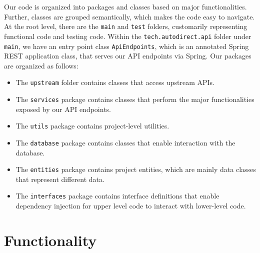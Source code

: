 \documentclass[fontsize=14pt]{article}
\begin{document}
Our code is organized into packages and classes based on major functionalities. Further, classes are grouped semantically, which makes the code easy to navigate. At the root level, there are the \texttt{main} and \texttt{test} folders, customarily representing functional code and testing code. Within the \texttt{tech.autodirect.api} folder under \texttt{main}, we have an entry point class \texttt{ApiEndpoints}, which is an annotated Spring REST application class, that serves our API endpoints via Spring. Our packages are organized as follows:
\begin{itemize}
    \item The \texttt{upstream} folder contains classes that access upstream APIs.
    
    \item The \texttt{services} package contains classes that perform the major functionalities exposed by our API endpoints.
    
    \item The \texttt{utils} package contains project-level utilities.
    
    \item The \texttt{database} package contains classes that enable interaction with the database.
    
    \item The \texttt{entities} package contains project entities, which are mainly data classes that represent different data.
    
    \item The \texttt{interfaces} package contains interface definitions that enable dependency injection for upper level code to interact with lower-level code.
\end{itemize}

\section*{Functionality}
\end{document}
